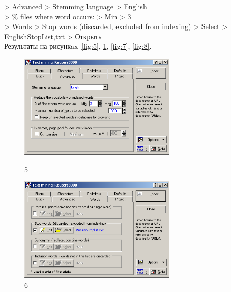 > Advanced > Stemming language > English \\
> \% files where word occurs: > Min > 3 \\
> Words > Stop words (discarded, excluded from indexing) > Select > EnglishStopList,txt > Открыть \\

Результаты на рисункax~\ref{fig:5}, \ref{fig:6}, \ref{fig:7}, \ref{fig:8}.

\begin{figure}[!h]
  \centering

  \begin{minipage}{0.49\textwidth}
    \centering

    \includegraphics[height=5cm]
    {inc/5.PNG}

    \caption{5}

    \label{fig:5}
  \end{minipage}
  \begin{minipage}{0.49\textwidth}
    \centering

    \includegraphics[height=5cm]
    {inc/6.PNG}

    \caption{6}

    \label{fig:6}
  \end{minipage}
\end{figure}

